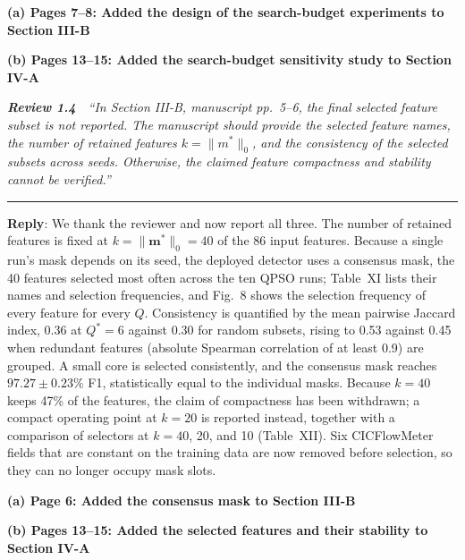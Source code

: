 \documentclass[11pt]{article}
\newcommand{\review}[2]{\par\bigskip\noindent\textbf{\textit{Review #1}}\ \ \textit{``#2''}\par\smallskip\hrule\medskip}
\newcommand{\reply}{\noindent\textbf{Reply}: }
\newcommand{\loc}[1]{\par\medskip\noindent\textbf{#1}\par}
\begin{document}
\loc{(a) Pages 7--8: Added the design of the search-budget experiments to Section III-B}

\loc{(b) Pages 13--15: Added the search-budget sensitivity study to Section IV-A}

\review{1.4}{In Section III-B, manuscript pp.~5--6, the final selected feature subset is not reported. The manuscript should provide the selected feature names, the number of retained features $k=\|m^{*}\|_0$, and the consistency of the selected subsets across seeds. Otherwise, the claimed feature compactness and stability cannot be verified.}

\reply We thank the reviewer and now report all three. The number of
retained features is fixed at $k=\|\mathbf{m}^{*}\|_0=40$ of the 86 input
features. Because a single run's mask depends on its seed, the deployed
detector uses a consensus mask, the 40 features selected most often across
the ten QPSO runs; Table~XI lists their names and selection frequencies, and
Fig.~8 shows the selection frequency of every feature for every $Q$.
Consistency is quantified by the mean pairwise Jaccard index, 0.36 at
$Q^{*}=6$ against 0.30 for random subsets, rising to 0.53 against 0.45 when
redundant features (absolute Spearman correlation of at least 0.9) are
grouped. A small core is selected consistently, and the consensus mask
reaches $97.27\pm0.23\%$ F1, statistically equal to the individual masks.
Because $k=40$ keeps 47\% of the features, the claim of compactness has been
withdrawn; a compact operating point at $k=20$ is reported instead, together
with a comparison of selectors at $k=40$, 20, and 10 (Table~XII). Six
CICFlowMeter fields that are constant on the training data are now removed
before selection, so they can no longer occupy mask slots.

\loc{(a) Page 6: Added the consensus mask to Section III-B}

\loc{(b) Pages 13--15: Added the selected features and their stability to Section IV-A}
\end{document}
